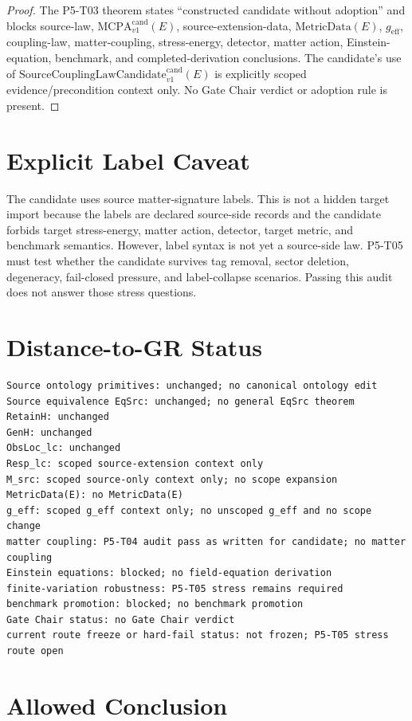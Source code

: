 \documentclass[11pt]{article}
\newcommand{\MetricData}{\mathrm{MetricData}}
\newcommand{\geff}{g_{\mathrm{eff}}}
\newcommand{\MCPA}{\mathrm{MCPA}^{\mathrm{cand}}_{v1}}
\newcommand{\SCLC}{\mathrm{SourceCouplingLawCandidate}^{\mathrm{cand}}_{v1}}
\begin{document}
\begin{proof}
The P5-T03 theorem states ``constructed candidate without adoption'' and
blocks source-law, \(\MCPA(E)\), source-extension-data, \(\MetricData(E)\),
\(\geff\), coupling-law, matter-coupling, stress-energy, detector, matter
action, Einstein-equation, benchmark, and completed-derivation conclusions.
The candidate's use of \(\SCLC(E)\) is explicitly scoped evidence/precondition
context only. No Gate Chair verdict or adoption rule is present.
\end{proof}

\section{Explicit Label Caveat}

The candidate uses source matter-signature labels. This is not a hidden target
import because the labels are declared source-side records and the candidate
forbids target stress-energy, matter action, detector, target metric, and
benchmark semantics. However, label syntax is not yet a source-side law. P5-T05
must test whether the candidate survives tag removal, sector deletion,
degeneracy, fail-closed pressure, and label-collapse scenarios. Passing this
audit does not answer those stress questions.

\section{Distance-to-GR Status}

\begin{verbatim}
Source ontology primitives: unchanged; no canonical ontology edit
Source equivalence EqSrc: unchanged; no general EqSrc theorem
RetainH: unchanged
GenH: unchanged
ObsLoc_lc: unchanged
Resp_lc: scoped source-extension context only
M_src: scoped source-only context only; no scope expansion
MetricData(E): no MetricData(E)
g_eff: scoped g_eff context only; no unscoped g_eff and no scope change
matter coupling: P5-T04 audit pass as written for candidate; no matter coupling
Einstein equations: blocked; no field-equation derivation
finite-variation robustness: P5-T05 stress remains required
benchmark promotion: blocked; no benchmark promotion
Gate Chair status: no Gate Chair verdict
current route freeze or hard-fail status: not frozen; P5-T05 stress route open
\end{verbatim}

\section{Allowed Conclusion}
\end{document}
